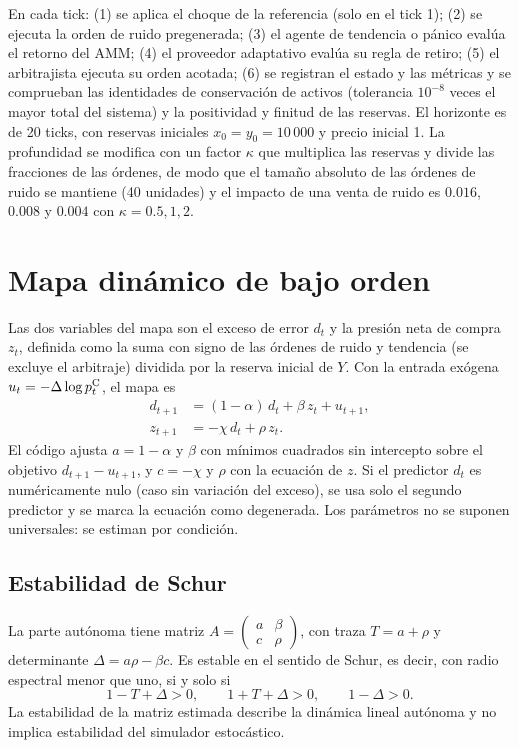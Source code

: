 En cada tick: (1) se aplica el choque de la referencia (solo en el tick 1); (2) se ejecuta la orden de ruido pregenerada; (3) el agente de tendencia o pánico evalúa el retorno del AMM; (4) el proveedor adaptativo evalúa su regla de retiro; (5) el arbitrajista ejecuta su orden acotada; (6) se registran el estado y las métricas y se comprueban las identidades de conservación de activos (tolerancia $10^{-8}$ veces el mayor total del sistema) y la positividad y finitud de las reservas. El horizonte es de 20 ticks, con reservas iniciales $x_0=y_0=10\,000$ y precio inicial 1. La profundidad se modifica con un factor $\kappa$ que multiplica las reservas y divide las fracciones de las órdenes, de modo que el tamaño absoluto de las órdenes de ruido se mantiene (40 unidades) y el impacto de una venta de ruido es $0.016$, $0.008$ y $0.004$ con $\kappa=0.5,1,2$.

\section{Mapa dinámico de bajo orden}

Las dos variables del mapa son el exceso de error $d_t$ y la presión neta de compra $z_t$, definida como la suma con signo de las órdenes de ruido y tendencia (se excluye el arbitraje) dividida por la reserva inicial de $Y$. Con la entrada exógena $u_t=-\Delta\log p^{\mathrm{C}}_t$, el mapa es
\begin{align}
  d_{t+1} &= (1-\alpha)\,d_t + \beta\,z_t + u_{t+1}, \label{eq:mapa-d}\\
  z_{t+1} &= -\chi\,d_t + \rho\,z_t. \label{eq:mapa-z}
\end{align}
El código ajusta $a=1-\alpha$ y $\beta$ con mínimos cuadrados sin intercepto sobre el objetivo $d_{t+1}-u_{t+1}$, y $c=-\chi$ y $\rho$ con la ecuación de $z$. Si el predictor $d_t$ es numéricamente nulo (caso sin variación del exceso), se usa solo el segundo predictor y se marca la ecuación como degenerada. Los parámetros no se suponen universales: se estiman por condición.

\subsection{Estabilidad de Schur}

La parte autónoma tiene matriz $A=\begin{pmatrix} a & \beta\\ c & \rho\end{pmatrix}$, con traza $T=a+\rho$ y determinante $\Delta=a\rho-\beta c$. Es estable en el sentido de Schur, es decir, con radio espectral menor que uno, si y solo si \cite{jury1962simplified,schur1917potenzreihen,elaydi2005difference}
\begin{equation}
  1-T+\Delta>0,\qquad 1+T+\Delta>0,\qquad 1-\Delta>0.
  \label{eq:schur}
\end{equation}
La estabilidad de la matriz estimada describe la dinámica lineal autónoma y no implica estabilidad del simulador estocástico.

